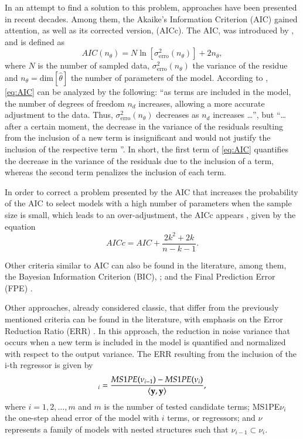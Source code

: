 In an attempt to find a solution to this problem, approaches have been presented in recent decades.
Among them, the Akaike’s Information Criterion (AIC) gained attention, as well as its corrected version, (AICc).
The AIC, was introduced by \cite{akaike1974}, and is defined as
\begin{equation}
   AIC(n_\theta) = N \ln[\sigma^2_{\text{erro}}(n_\theta)] + 2 n _\theta
   \label{eq:AIC},
\end{equation}
where $N$ is the number of sampled data, $\sigma^2_{\text{erro}}(n_\theta)$ the variance of the residue and $n_\theta = \text{dim}[\hat {\theta}]$ the number of parameters of the model.
According to \cite{aguirre2015}, \eqref{eq:AIC} can be analyzed by the following: ``as terms are included in the model, the number of degrees of freedom $n_d$ increases, allowing a more accurate adjustment to the data. Thus, $\sigma^2_{\text{erro}}(n_\theta)$ decreases as $n_d$ increases \dots'',
but ``\dots after a certain moment, the decrease in the variance of the residuals resulting from the inclusion of a new term is insignificant and would not justify the inclusion of the respective term ''.
In short, the first term of \eqref{eq:AIC} quantifies the decrease in the variance of the residuals due to the inclusion of a term, whereas the second term penalizes the inclusion of each term.

In order to correct a problem presented by the AIC that increases the probability of the AIC to select models with a high number of parameters when the sample size is small, which leads to an over-adjustment, the AICc appears \citep{cavanaugh1997}, given by the equation
\begin{equation}
   AICc = AIC + \frac{2k^2+2k}{n-k-1}
   \label{eq:AICc}.
\end{equation}

Other criteria similar to AIC can also be found in the literature, among them, the Bayesian Information Criterion (BIC), \citep{schwarz1978}; and the Final Prediction Error (FPE) \citep{kashyap1977}.

Other approaches, already considered classic, that differ from the previously mentioned criteria can be found in the literature, with emphasis on the Error Reduction Ratio (ERR) \citep{billings1989}.
In this approach, the reduction in noise variance that occurs when a new term is included in the model is quantified and normalized with respect to the output variance.
The ERR resulting from the inclusion of the i-th regressor is given by
\begin{equation}
   [\text{ERR}]_i  = \frac{MS1PE(\nu_{i-1})-MS1PE(\nu_i)}{\langle\vy,\vy\rangle}
   \label{eq:ERR},
\end{equation}
where $i = 1, 2, \dots, m$ and $m$ is the number of tested candidate terms; MS1PE$\nu_i$ the one-step ahead error of the model with $i$ terms, or regressors; and $\nu$ represents a family of models with nested structures such that $\nu_{i-1} \subset \nu_i$.

